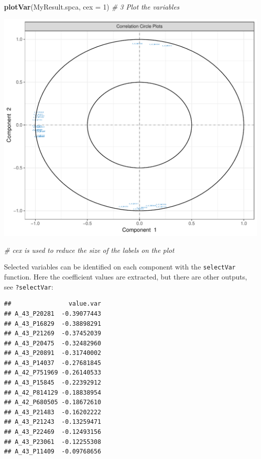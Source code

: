 \documentclass[]{book}
\newenvironment{Shaded}{\begin{snugshade}}{\end{snugshade}}
\newcommand{\CommentTok}[1]{\textcolor[rgb]{0.56,0.35,0.01}{\textit{#1}}}
\newcommand{\DataTypeTok}[1]{\textcolor[rgb]{0.13,0.29,0.53}{#1}}
\newcommand{\DecValTok}[1]{\textcolor[rgb]{0.00,0.00,0.81}{#1}}
\newcommand{\KeywordTok}[1]{\textcolor[rgb]{0.13,0.29,0.53}{\textbf{#1}}}
\newcommand{\NormalTok}[1]{#1}
\newcommand{\OperatorTok}[1]{\textcolor[rgb]{0.81,0.36,0.00}{\textbf{#1}}}
\begin{document}
\begin{Shaded}
\begin{Highlighting}[]
\KeywordTok{plotVar}\NormalTok{(MyResult.spca, }\DataTypeTok{cex =} \DecValTok{1}\NormalTok{)                                        }\CommentTok{# 3 Plot the variables}
\end{Highlighting}
\end{Shaded}

\begin{center}\includegraphics[width=0.5\linewidth,]{Figures/03-pca-liver-plotIndiv-args-2} \end{center}

\begin{Shaded}
\begin{Highlighting}[]
\CommentTok{# cex is used to reduce the size of the labels on the plot}
\end{Highlighting}
\end{Shaded}

Selected variables can be identified on each component with the \texttt{selectVar} function. Here the coefficient values are extracted, but there are other outputs, see \texttt{?selectVar}:

\begin{Shaded}
\end{Shaded}

\begin{verbatim}
##                value.var
## A_43_P20281  -0.39077443
## A_43_P16829  -0.38898291
## A_43_P21269  -0.37452039
## A_43_P20475  -0.32482960
## A_43_P20891  -0.31740002
## A_43_P14037  -0.27681845
## A_42_P751969 -0.26140533
## A_43_P15845  -0.22392912
## A_42_P814129 -0.18838954
## A_42_P680505 -0.18672610
## A_43_P21483  -0.16202222
## A_43_P21243  -0.13259471
## A_43_P22469  -0.12493156
## A_43_P23061  -0.12255308
## A_43_P11409  -0.09768656
\end{verbatim}
\end{document}

